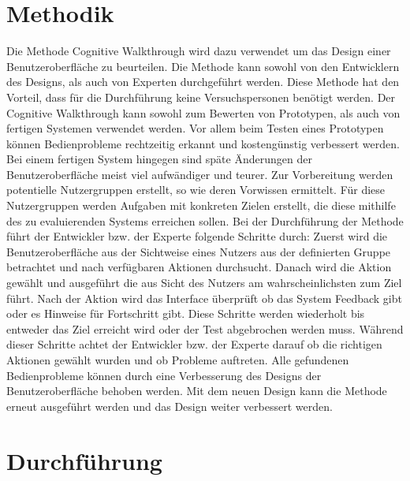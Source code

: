 \documentclass[	12pt, 
				a4paper, 
				BCOR=10mm, %
				DIV=12, 
				parskip=half, %
				headings=small, %
				twoside, %
				ngerman,
				bibliography=totoc,index=totoc, listof=totoc,
				numbers=noendperiod
				]{scrbook} %
\theoremstyle{plain}%
\theoremstyle{definition}
\theoremstyle{remark}
\begin{document}
\chapter{Methodik}
Die Methode Cognitive Walkthrough wird dazu verwendet um das Design einer Benutzeroberfläche zu beurteilen. Die Methode kann sowohl von den Entwicklern des Designs, als auch von Experten durchgeführt werden. Diese Methode hat den Vorteil, dass für die Durchführung keine Versuchspersonen benötigt werden. Der Cognitive Walkthrough kann sowohl zum Bewerten von Prototypen, als auch von fertigen Systemen verwendet werden. Vor allem beim Testen eines Prototypen können Bedienprobleme rechtzeitig erkannt und kostengünstig verbessert werden. Bei einem fertigen System hingegen sind späte Änderungen der Benutzeroberfläche meist viel aufwändiger und teurer. Zur Vorbereitung werden potentielle Nutzergruppen erstellt, so wie deren Vorwissen ermittelt. Für diese Nutzergruppen werden Aufgaben mit konkreten Zielen erstellt, die diese mithilfe des zu evaluierenden Systems erreichen sollen. Bei der Durchführung der Methode führt der Entwickler bzw. der Experte folgende Schritte durch: Zuerst wird die Benutzeroberfläche aus der Sichtweise eines Nutzers aus der definierten Gruppe betrachtet und nach verfügbaren Aktionen durchsucht. Danach wird die Aktion gewählt und ausgeführt die aus Sicht des Nutzers am wahrscheinlichsten zum Ziel führt. Nach der Aktion wird das Interface überprüft ob das System Feedback gibt oder es Hinweise für Fortschritt gibt. Diese Schritte werden wiederholt bis entweder das Ziel erreicht wird oder der Test abgebrochen werden muss. Während dieser Schritte achtet der Entwickler bzw. der Experte darauf ob die richtigen Aktionen gewählt wurden und ob Probleme auftreten. Alle gefundenen Bedienprobleme können durch eine Verbesserung des Designs der Benutzeroberfläche behoben werden. Mit dem neuen Design kann die Methode erneut ausgeführt werden und das Design weiter verbessert werden.


\chapter{Durchführung}
\end{document}
